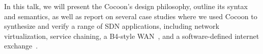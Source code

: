 \documentclass[letterpaper,10pt,twocolumn]{article}
\begin{document}

In this talk, we will present the Cocoon's design philosophy, 
outline its syntax and semantics, as well as report on several 
case studies where we used Cocoon to synthesize and verify a range 
of SDN applications, including network virtualization, service 
chaining, a B4-style WAN~\cite{Jain_KMOPSVWZZZHSV_13}, and a 
software-defined internet exchange~\cite{Gupta_MBCFRV_16}. 



\setlength{\bibsep}{1pt}
%


\end{document}
